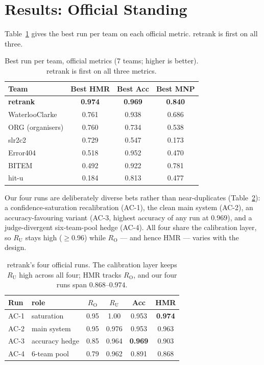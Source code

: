\documentclass[sigconf,nonacm]{acmart}
\newcommand{\HMR}{\textsc{HMR}}
\newcommand{\MNP}{\textsc{MNP}}
\newcommand{\RO}{R_{\mathrm{O}}}
\newcommand{\RU}{R_{\mathrm{U}}}
\begin{document}
\section{Results: Official Standing}
\label{sec:results}
Table~\ref{tab:standing} gives the best run per team on each official metric. retrank is
first on all three.

\begin{table}[t]
\caption{Best run per team, official metrics (7 teams; higher is better). retrank is first
on all three metrics.}
\label{tab:standing}
\small
\begin{tabular}{lccc}
\toprule
Team & Best \HMR & Best Acc & Best \MNP \\
\midrule
\textbf{retrank}      & \textbf{0.974} & \textbf{0.969} & \textbf{0.840} \\
WaterlooClarke        & 0.761 & 0.938 & 0.686 \\
ORG (organisers)      & 0.760 & 0.734 & 0.538 \\
slr2c2                & 0.729 & 0.547 & 0.173 \\
Error404              & 0.518 & 0.952 & 0.470 \\
BITEM                 & 0.492 & 0.922 & 0.781 \\
hit-u                 & 0.184 & 0.813 & 0.477 \\
\bottomrule
\end{tabular}
\end{table}

Our four runs are deliberately diverse bets rather than near-duplicates
(Table~\ref{tab:retrankruns}): a confidence-saturation recalibration (AC-1), the clean main
system (AC-2), an accuracy-favouring variant (AC-3, highest accuracy of any run at $0.969$),
and a judge-divergent six-team-pool hedge (AC-4). All four share the calibration layer, so
$\RU$ stays high ($\ge0.96$) while $\RO$ --- and hence \HMR{} --- varies with the design.

\begin{table}[t]
\caption{retrank's four official runs. The calibration layer keeps $\RU$ high across all
four; \HMR{} tracks $\RO$, and our four runs span $0.868$--$0.974$.}
\label{tab:retrankruns}
\centering\small
\begin{tabular}{llcccc}
\toprule
Run & role & $\RO$ & $\RU$ & Acc & \HMR \\
\midrule
AC-1 & saturation & 0.95 & 1.00 & 0.953 & \textbf{0.974} \\
AC-2 & main system & 0.95 & 0.976 & 0.953 & 0.963 \\
AC-3 & accuracy hedge & 0.85 & 0.964 & \textbf{0.969} & 0.903 \\
AC-4 & 6-team pool & 0.79 & 0.962 & 0.891 & 0.868 \\
\bottomrule
\end{tabular}
\end{table}
\end{document}
